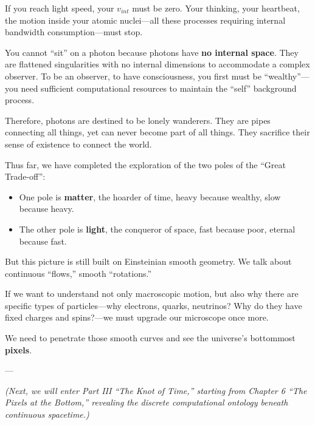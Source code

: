 If you reach light speed, your $v_{int}$ must be zero. Your thinking, your heartbeat, the motion inside your atomic nuclei---all these processes requiring internal bandwidth consumption---must stop.

You cannot ``sit'' on a photon because photons have \textbf{no internal space}. They are flattened singularities with no internal dimensions to accommodate a complex observer. To be an observer, to have consciousness, you first must be ``wealthy''---you need sufficient computational resources to maintain the ``self'' background process.

Therefore, photons are destined to be lonely wanderers. They are pipes connecting all things, yet can never become part of all things. They sacrifice their sense of existence to connect the world.

Thus far, we have completed the exploration of the two poles of the ``Great Trade-off'':

\begin{itemize}
\item One pole is \textbf{matter}, the hoarder of time, heavy because wealthy, slow because heavy.

\item The other pole is \textbf{light}, the conqueror of space, fast because poor, eternal because fast.
\end{itemize}

But this picture is still built on Einsteinian smooth geometry. We talk about continuous ``flows,'' smooth ``rotations.''

If we want to understand not only macroscopic motion, but also why there are specific types of particles---why electrons, quarks, neutrinos? Why do they have fixed charges and spins?---we must upgrade our microscope once more.

We need to penetrate those smooth curves and see the universe's bottommost \textbf{pixels}.

---

\textit{(Next, we will enter Part III ``The Knot of Time,'' starting from Chapter 6 ``The Pixels at the Bottom,'' revealing the discrete computational ontology beneath continuous spacetime.)}


